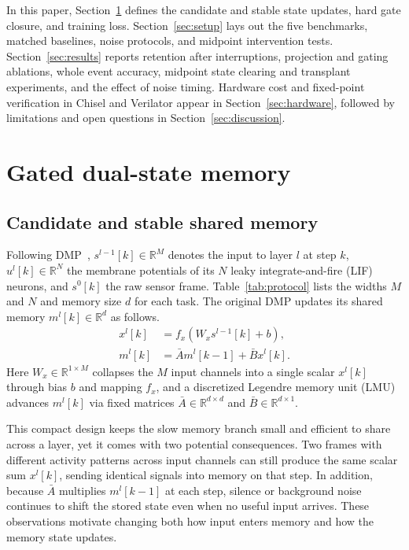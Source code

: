 \documentclass[10pt,twocolumn]{article}
\newcommand{\R}{\mathbb{R}}
\begin{document}
In this paper, Section~\ref{sec:method} defines the candidate and stable state updates, hard gate closure, and training loss. Section~\ref{sec:setup} lays out the five benchmarks, matched baselines, noise protocols, and midpoint intervention tests. Section~\ref{sec:results} reports retention after interruptions, projection and gating ablations, whole event accuracy, midpoint state clearing and transplant experiments, and the effect of noise timing. Hardware cost and fixed-point verification in Chisel and Verilator appear in Section~\ref{sec:hardware}, followed by limitations and open questions in Section~\ref{sec:discussion}.

\section{Gated dual-state memory}
\label{sec:method}
\subsection{Candidate and stable shared memory}
Following DMP~\cite{dmp}, $s^{l-1}[k]\in\R^M$ denotes the input to layer $l$ at step $k$, $u^l[k]\in\R^N$ the membrane potentials of its $N$ leaky integrate-and-fire (LIF) neurons, and $s^0[k]$ the raw sensor frame. Table~\ref{tab:protocol} lists the widths $M$ and $N$ and memory size $d$ for each task. The original DMP updates its shared memory $m^l[k]\in\R^d$ as follows.
\begin{equation}
\begin{aligned}
 x^l[k]&=f_x(W_x s^{l-1}[k]+b),\\
 m^l[k]&=\bar A m^l[k-1]+\bar B x^l[k] .
\end{aligned}
\label{eq:dmp}
\end{equation}
Here $W_x\in\R^{1\times M}$ collapses the $M$ input channels into a single scalar $x^l[k]$ through bias $b$ and mapping $f_x$, and a discretized Legendre memory unit (LMU) advances $m^l[k]$ via fixed matrices $\bar A\in\R^{d\times d}$ and $\bar B\in\R^{d\times 1}$.

This compact design keeps the slow memory branch small and efficient to share across a layer, yet it comes with two potential consequences. Two frames with different activity patterns across input channels can still produce the same scalar sum $x^l[k]$, sending identical signals into memory on that step. In addition, because $\bar A$ multiplies $m^l[k-1]$ at each step, silence or background noise continues to shift the stored state even when no useful input arrives. These observations motivate changing both how input enters memory and how the memory state updates.
\end{document}
